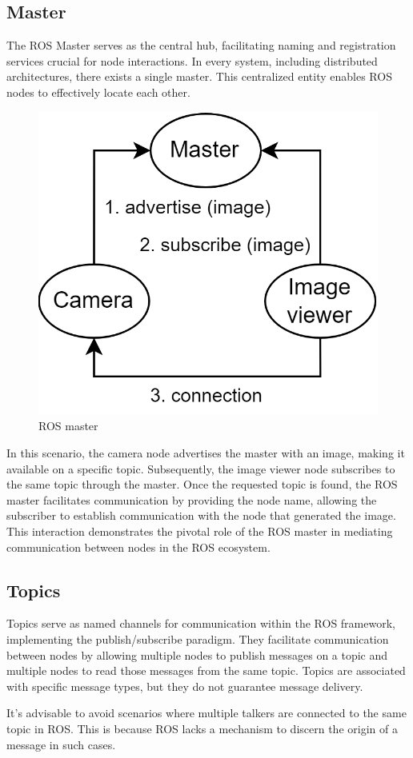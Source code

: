 \subsection{Master}
The ROS Master serves as the central hub, facilitating naming and registration services crucial for node interactions. 
In every system, including distributed architectures, there exists a single master.
This centralized entity enables ROS nodes to effectively locate each other.
\begin{figure}[H]
    \centering
    \includegraphics[width=0.5\linewidth]{images/master.png}
    \caption{ROS master}
\end{figure}
In this scenario, the camera node advertises the master with an image, making it available on a specific topic. 
Subsequently, the image viewer node subscribes to the same topic through the master.
Once the requested topic is found, the ROS master facilitates communication by providing the node name, allowing the subscriber to establish communication with the node that generated the image. 
This interaction demonstrates the pivotal role of the ROS master in mediating communication between nodes in the ROS ecosystem.

\subsection{Topics}
Topics serve as named channels for communication within the ROS framework, implementing the publish/subscribe paradigm. 
They facilitate communication between nodes by allowing multiple nodes to publish messages on a topic and multiple nodes to read those messages from the same topic. 
Topics are associated with specific message types, but they do not guarantee message delivery.

It's advisable to avoid scenarios where multiple talkers are connected to the same topic in ROS. 
This is because ROS lacks a mechanism to discern the origin of a message in such cases.

